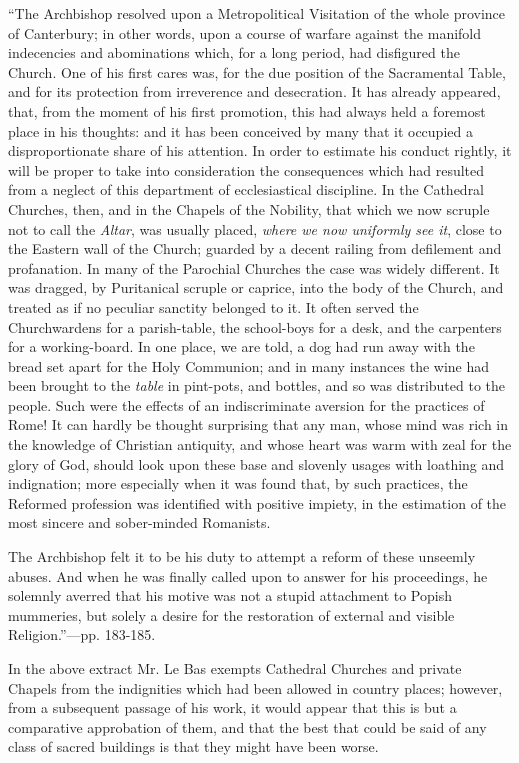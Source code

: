 ``The Archbishop resolved upon a
Metropolitical Visitation of the whole province of Canterbury; in other
words, upon a course of warfare against the manifold indecencies and
abominations which, for a long period, had disfigured the Church. One of
his first cares was, for the due position of the Sacramental Table, and
for its protection from irreverence and desecration. It has already
appeared, that, from the moment of his first promotion, this had always
held a foremost place in his thoughts: and it has been conceived by many
that it occupied a disproportionate share of his attention. In order to
estimate his conduct rightly, it will be proper
to take into consideration the consequences which had resulted from a
neglect of this department of ecclesiastical discipline. In the
Cathedral Churches, then, and in the Chapels of the Nobility, that which
we now scruple not to call the \emph{Altar}, was usually placed, \emph{where
we now uniformly see it}, close to the Eastern wall of the Church;
guarded by a decent railing from defilement and profanation. In many of
the Parochial Churches the case was widely different. It was dragged, by
Puritanical scruple or caprice, into the body of the Church, and treated
as if no peculiar sanctity belonged to it. It often served the
Churchwardens for a parish-table, the school-boys for a desk, and the
carpenters for a working-board. In one place, we are told, a dog had run
away with the bread set apart for the Holy Communion; and in many
instances the wine had been brought to the \emph{table} in pint-pots,
and bottles, and so was distributed to the people. Such were the effects
of an indiscriminate aversion for the practices of Rome! It can hardly
be thought surprising that any man, whose mind was rich in the knowledge
of Christian antiquity, and whose heart was warm with zeal for the glory
of God, should look upon these base and slovenly usages with loathing
and indignation; more especially when it was found that, by such
practices, the Reformed profession was identified with positive impiety,
in the estimation of the most sincere and sober-minded Romanists.

The Archbishop felt it to be his
duty to attempt a reform of these unseemly abuses. And when he was
finally called upon to answer for his proceedings, he solemnly averred
that his motive was not a stupid attachment to Popish mummeries, but
solely a desire for the restoration of external and visible Religion.''—pp.
183-185.

In the above extract Mr. Le Bas exempts Cathedral
Churches and private Chapels from the indignities which had been allowed
in country places; however, from a subsequent passage of his work, it
would appear that this is but a comparative approbation of them, and
that the best that could be said of any class of sacred buildings is
that they might have been worse.

